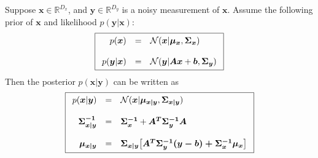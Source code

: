 \documentclass{article}
\newcommand{\bs}{\boldsymbol}
\begin{document}
\noindent
Suppose $\boldsymbol{x} \in \mathbb{R}^{D_x}$, and $\boldsymbol{y} \in \mathbb{R}^{D_y}$ is a noisy measurement of $\boldsymbol{x}$. Assume the following prior of $\boldsymbol{x}$ and likelihood $p(\boldsymbol{y} | \boldsymbol{x})$:
\begin{equation*}
\boxed{
\begin{array}{r c l}
p(\boldsymbol{x}) &=& \mathcal{N} (\boldsymbol{x}| \boldsymbol{\mu_x}, \boldsymbol{\Sigma_x}) \\
&& \\
p(\boldsymbol{y} | \boldsymbol{x}) &=& \mathcal{N} (\boldsymbol{y} | \boldsymbol{A} \boldsymbol{x} + \boldsymbol{b}, \boldsymbol{\Sigma_y}) 
\end{array}
}
\end{equation*}
\noindent
Then the posterior $p(\bs{x} | \bs{y})$ can be written as
\begin{equation*}
\boxed{
\begin{array}{r c l}
p(\boldsymbol{x} | \boldsymbol{y}) &=& \mathcal{N} (\bs{x} | \bs{\mu_{x|y}}, \bs{\Sigma_{x|y}}) \\
&& \\
\bs{\Sigma^{-1}_{x|y}} &=& \bs{\Sigma_{x}^{-1}} + \bs{A^T \Sigma_{y}^{-1} A} \\
&& \\
\bs{\mu_{x|y}} &=& \bs{\Sigma_{x|y}} \big[ \bs{A^T \Sigma_{y}^{-1} (y - b) + \Sigma_x^{-1} \mu_x} \big]
\end{array}
}
\end{equation*}
\end{document}

